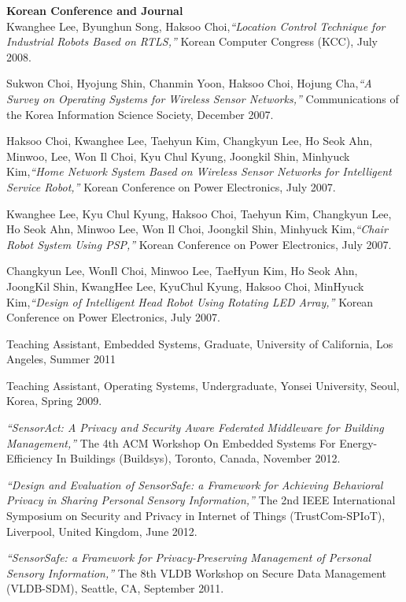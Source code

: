 \documentclass[12pt,letterpaper]{article}
\newcommand{\mhead}[1]{\leavevmode\marginpar{\sffamily\footnotesize #1}}
\begin{document}
\bigskip
\textbf{Korean Conference and Journal}\\ 
Kwanghee Lee, Byunghun Song, Haksoo Choi,\emph{``Location Control Technique for Industrial Robots Based on RTLS,''} Korean Computer Congress (KCC), July 2008.

\bigskip
Sukwon Choi, Hyojung Shin, Chanmin Yoon, Haksoo Choi, Hojung Cha,\emph{``A Survey on Operating Systems for Wireless Sensor Networks,''} Communications of the Korea Information Science Society, December 2007.

\bigskip
Haksoo Choi, Kwanghee Lee, Taehyun Kim, Changkyun Lee, Ho Seok Ahn, Minwoo, Lee, Won Il Choi, Kyu Chul Kyung, Joongkil Shin, Minhyuck Kim,\emph{``Home Network System Based on Wireless Sensor Networks for Intelligent Service Robot,''} Korean Conference on Power Electronics, July 2007.

\bigskip
Kwanghee Lee, Kyu Chul Kyung, Haksoo Choi, Taehyun Kim, Changkyun Lee, Ho Seok Ahn, Minwoo Lee, Won Il Choi, Joongkil Shin, Minhyuck Kim,\emph{``Chair Robot System Using PSP,''} Korean Conference on Power Electronics, July 2007.

\bigskip
Changkyun Lee, WonIl Choi, Minwoo Lee, TaeHyun Kim, Ho Seok Ahn, JoongKil Shin, KwangHee Lee, KyuChul Kyung, Haksoo Choi, MinHyuck Kim,\emph{``Design of Intelligent Head Robot Using Rotating LED Array,''} Korean Conference on Power Electronics, July 2007.

\bigskip
\mhead{Teaching}%
Teaching Assistant, Embedded Systems, Graduate, University of California, Los Angeles, Summer 2011

\medskip
Teaching Assistant, Operating Systems, Undergraduate, Yonsei University, Seoul, Korea, Spring 2009.

\bigskip
\mhead{Talks}%
\emph{``SensorAct: A Privacy and Security Aware Federated Middleware for Building Management,''} The 4th ACM Workshop On Embedded Systems For Energy-Efficiency In Buildings (Buildsys), Toronto, Canada, November 2012.

\medskip
\emph{``Design and Evaluation of SensorSafe: a Framework for Achieving Behavioral Privacy in Sharing Personal Sensory Information,''} The 2nd IEEE International Symposium on Security and Privacy in Internet of Things (TrustCom-SPIoT), Liverpool, United Kingdom, June 2012.

\medskip
\emph{``SensorSafe: a Framework for Privacy-Preserving Management of Personal Sensory Information,''} The 8th VLDB Workshop on Secure Data Management (VLDB-SDM), Seattle, CA, September 2011.
\end{document}
